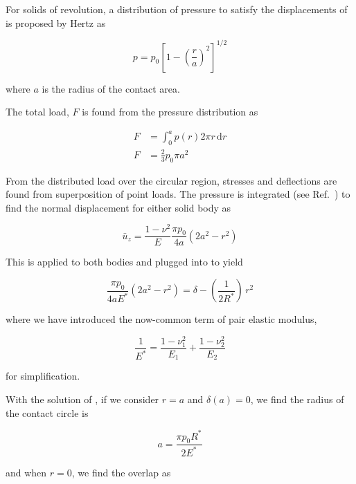 For solids of revolution, a distribution of pressure to satisfy the displacements of  is proposed by Hertz as

\begin{equation}
	p = p_0 \left[1-\left(\frac{r}{a}\right)^2\right]^{1/2}
\end{equation}

where $a$ is the radius of the contact area.

The total load, $F$ is found from the pressure distribution as

\begin{align}
	F &= \int_0^a \! p(r) 2\pi r\, \mathrm{d}r \nonumber\\
	F & = \frac{2}{3} p_0 \pi a^2\label{eq:hertzforcewithpressure}
\end{align}

From the distributed load over the circular region, stresses and deflections are found from superposition of point loads. The pressure is integrated (see Ref.~\cite{Johnson1985}) to find the normal displacement for either solid body as

\begin{equation}
	\bar{u}_z = \frac{1-\nu^2}{E}\frac{\pi p_0}{4a}\left(2a^2 - r^2\right)
\end{equation}

This is applied to both bodies and plugged into  to yield

\begin{equation}\label{eq:pressindisplacement}
	\frac{\pi p_0}{4aE^*}\left(2a^2 - r^2\right) = \delta - \left(\frac{1}{2R^*}\right)\, r^2
\end{equation}

where we have introduced the now-common term of pair elastic modulus,

\begin{equation}
	\frac{1}{E^*} = \frac{1-\nu_1^2}{E_1} + \frac{1-\nu_2^2}{E_2}
\end{equation}

for simplification.

With the solution of , if we consider $r = a$ and $\delta(a) = 0$, we find the radius of the contact circle is

\begin{equation}\label{eq:hertz-radius}
	a = \frac{\pi p_0 R^*}{2E^*}
\end{equation}

and when $r= 0$, we find the overlap as

